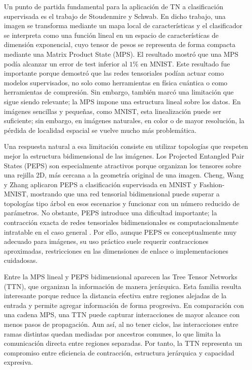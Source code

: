 Un punto de partida fundamental para la aplicación de TN a clasificación supervisada es el trabajo de Stoudenmire y Schwab. En dicho trabajo, una imagen se transforma mediante un mapa local de características y el clasificador se interpreta como una función lineal en un espacio de características de dimensión exponencial, cuyo tensor de pesos se representa de forma compacta mediante una Matrix Product State (MPS). El resultado mostró que una MPS podía alcanzar un error de test inferior al $1\%$ en MNIST. Este resultado fue importante porque demostró que las redes tensoriales podían actuar como modelos supervisados, no solo como herramientas en física cuántica o como herramientas de compresión. Sin embargo, también marcó una limitación que sigue siendo relevante; la MPS impone una estructura lineal sobre los datos. En imágenes sencillas y pequeñas, como MNIST, esta linealización puede ser suficiente; sin embargo, en imágenes naturales, en color o de mayor resolución, la pérdida de localidad espacial se vuelve mucho más problemática.

Una respuesta natural a esa limitación consiste en utilizar topologías que respeten mejor la estructura bidimensional de las imágenes. Los Projected Entangled Pair States (PEPS) son especialmente atractivos porque organizan los tensores sobre una rejilla 2D, más cercana a la geometría original de una imagen. Cheng, Wang y Zhang aplicaron PEPS a clasificación supervisada en MNIST y Fashion-MNIST, mostrando que una red tensorial bidimensional puede superar a topologías tipo árbol en esos escenarios y funcionar con un número reducido de parámetros. No obstante, PEPS introduce una dificultad importante; la contracción exacta de redes tensoriales bidimensionales es computacionalmente intratable en el caso general . Por ello, aunque PEPS es conceptualmente muy adecuado para imágenes, su uso práctico suele requerir contracciones aproximadas, restricciones en las dimensiones de enlace o implementaciones cuidadosas.

Entre la MPS lineal y PEPS bidimensional aparecen las Tree Tensor Networks (TTN), que organizan la información de manera jerárquica. Esta familia resulta interesante porque reduce la distancia efectiva entre regiones alejadas de la entrada y permite agregar información de forma progresiva. En comparación con una cadena MPS, una TTN puede capturar interacciones de mayor alcance con menos pasos de propagación. Aun así, al no tener ciclos, las interacciones entre ramas distintas quedan mediadas por ancestros comunes, lo que limita la comunicación directa entre regiones separadas. Por tanto, la TTN representa un compromiso entre eficiencia de contracción, estructura jerárquica y capacidad expresiva.

